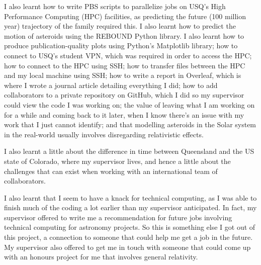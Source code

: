 \documentclass[12pt,a4paper,openright]{article}
\begin{document}
I also learnt how to write PBS scripts to parallelize jobs on USQ's High Performance Computing (HPC) facilities, as predicting the future (100 million year) trajectory of the family required this. I also learnt how to predict the motion of asteroids using the REBOUND Python library. I also learnt how to produce publication-quality plots using Python's Matplotlib library; how to connect to USQ's student VPN, which was required in order to access the HPC; how to connect to the HPC using SSH; how to transfer files between the HPC and my local machine using SSH; how to write a report in Overleaf, which is where I wrote a journal article detailing everything I did; how to add collaborators to a private repository on GitHub, which I did so my supervisor could view the code I was working on; the value of leaving what I am working on for a while and coming back to it later, when I know there's an issue with my work that I just cannot identify; and that modelling asteroids in the Solar system in the real-world usually involves disregarding relativistic effects.

I also learnt a little about the difference in time between Queensland and the US state of Colorado, where my supervisor lives, and hence a little about the challenges that can exist when working with an international team of collaborators.

I also learnt that I seem to have a knack for technical computing, as I was able to finish much of the coding a lot earlier than my supervisor anticipated. In fact, my supervisor offered to write me a recommendation for future jobs involving technical computing for astronomy projects. So this is something else I got out of this project, a connection to someone that could help me get a job in the future. My supervisor also offered to get me in touch with someone that could come up with an honours project for me that involves general relativity. 
\end{document}
